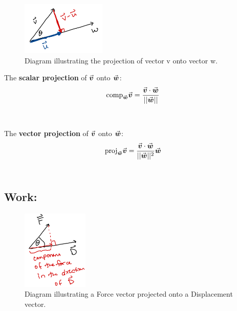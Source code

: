 

\begin{figure}
\centering
\includegraphics[height=1in]{Ch10s3-projections.png}
\caption{Diagram illustrating the projection of vector v onto vector w.}
\end{figure}

%


\hspace*{.2in}



The \textbf{scalar projection} of \(\v\) onto \(\w\): \[\text{comp}_{\w} \v = \frac{\v \cdot \w}{||\w||}\] \\~\\
The \textbf{vector projection} of \(\v\) onto \(\w\): \[\text{proj}_{\w} \v = \frac{\v \cdot \w}{||\w||^2}\w\] \\


\vspace*{.1in}



\subsection*{Work: }

\begin{figure}
\centering
\includegraphics[height=1.5in]{Ch10s3-work2.png}
\caption{Diagram illustrating a Force vector projected onto a Displacement vector.}
\end{figure}
%


